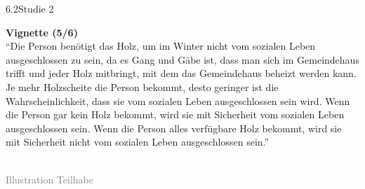 \documentclass[xcolor=table,9pt,aspectratio=169]{beamer}
\begin{document}
\begin{frame}{\vspace*{10mm}6.2\hspace*{1em}Studie 2}
\begin{multicols}{2}
   \textbf{Vignette (5/6)}\\
   \enquote{Die Person benötigt das Holz, um im Winter nicht vom sozialen Leben ausgeschlossen zu sein, da es Gang und Gäbe ist, dass man sich im Gemeindehaus trifft und jeder Holz mitbringt, mit dem das Gemeindehaus beheizt werden kann. Je mehr Holzscheite die Person bekommt, desto geringer ist die Wahrscheinlichkeit, dass sie vom sozialen Leben ausgeschlossen sein wird. Wenn die Person gar kein Holz bekommt, wird sie mit Sicherheit vom sozialen Leben ausgeschlossen sein. Wenn die Person alles verfügbare Holz bekommt, wird sie mit Sicherheit nicht vom sozialen Leben ausgeschlossen sein.}\\
   \vfill
   \begin{center}
      \\
      \footnotesize{\textcolor{gray}{Illustration Teilhabe}}
   \end{center}
\end{multicols}
\end{frame}
\end{document}

